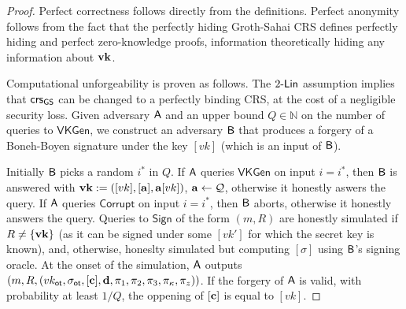 \begin{proof}
Perfect correctness follows directly from the definitions. Perfect anonymity follows from the fact that the perfectly hiding Groth-Sahai CRS defines perfectly hiding and perfect zero-knowledge proofs, information theoretically hiding any information about $\mathbf{vk}$.

Computational unforgeability is proven as follows. The $2\mbox{-}\mathsf{Lin}$ assumption implies that $\mathsf{crs}_{\mathsf{GS}}$ can be changed to a perfectly binding CRS, at the cost of a negligible security loss. Given adversary $\mathsf{A}$ and an upper bound $Q\in\mathbb{N}$ on the number of queries to $\mathsf{VKGen}$, we construct an adversary $\mathsf{B}$ that produces a forgery of a Boneh-Boyen signature under the key $[vk]$ (which is an input of $\mathsf{B}$).

Initially $\mathsf{B}$ picks a random $i^*$ in $Q$.
If $\mathsf{A}$ queries $\mathsf{VKGen}$ on input $i=i^*$, then $\mathsf{B}$ is answered with $\mathbf{vk}:=([vk],[\mathbf{a}],\mathbf{a}[vk])$, $\mathbf{a}\gets\mathcal{Q}$, otherwise it honestly aswers the query. 
If $\mathsf{A}$ queries $\mathsf{Corrupt}$ on input $i=i^*$, then $\mathsf{B}$ aborts, otherwise it honestly answers the query.
Queries to $\mathsf{Sign}$ of the form $(m,R)$ are honestly simulated if $R\neq\{\mathbf{vk}\}$ (as it can be signed under some $[vk']$ for which the secret key is known), and, otherwise, honeslty simulated but computing $[\sigma]$ using $\mathsf{B}$'s signing oracle. At the onset of the simulation, $\mathsf{A}$ outputs $(m,R,(vk_\mathsf{ot},\sigma_\mathsf{ot},[\mathbf{c}],\mathbf{d},\pi_1,\pi_2,\pi_3,\pi_\kappa,\pi_z))$. If the forgery of $\mathsf{A}$ is valid, with probability at least $1/Q$, the oppening of $[\mathbf{c}]$ is equal to $[vk]$.  


\end{proof}
